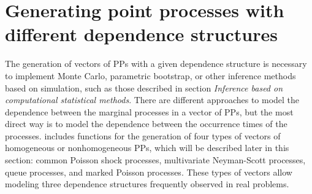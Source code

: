 \section{Generating point processes with different  dependence structures}

\label{Section6}

The generation  of vectors of  PPs with a given dependence structure is   necessary  to implement Monte Carlo,  parametric bootstrap,  or other inference methods based on simulation, such as those described in section  \textit{Inference based on computational statistical methods}. There are different approaches to model the dependence between the  marginal processes in a vector  of PPs, but  the most direct way is to   model  the dependence between the occurrence times  of the  processes.    includes  functions for the generation of four types  of vectors of homogeneous or nonhomogeneous PPs,  which will be described later in this section:  common Poisson shock processes,  multivariate Neyman-Scott processes, queue processes, and marked Poisson processes. 
These types of vectors allow  modeling  three dependence structures   frequently observed in real problems.   




